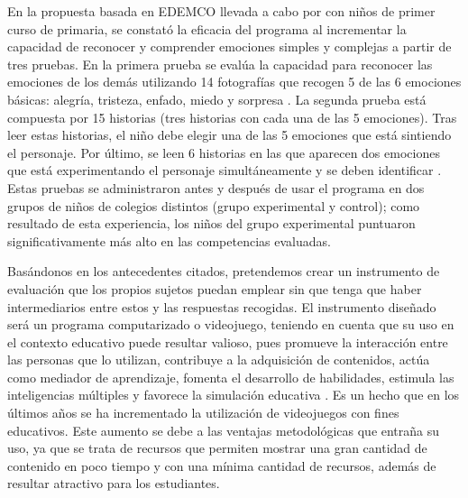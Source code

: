 \documentclass[spanish]{textolivre}
\begin{document}
En la propuesta basada en EDEMCO llevada a cabo por \textcite{ambrona_benito_eficacia_2012} con niños de primer curso de primaria, se constató la eficacia del programa al incrementar la capacidad de reconocer y comprender emociones simples y complejas a partir de tres pruebas. En la primera prueba se evalúa la capacidad para reconocer las emociones de los demás utilizando 14 fotografías que recogen 5 de las 6 emociones básicas: alegría, tristeza, enfado, miedo y sorpresa \cite{ekman_universal_1970,ekman_que_2003,ekman_repertoire_1969,ekman_que_1975}. La segunda prueba está compuesta por 15 historias (tres historias con cada una de las 5 emociones). Tras leer estas historias, el niño debe elegir una de las 5 emociones que está sintiendo el personaje. Por último, se leen 6 historias en las que aparecen dos emociones que está experimentando el personaje simultáneamente y se deben identificar \cite{ambrona_benito_eficacia_2012}. Estas pruebas se administraron antes y después de usar el programa en dos grupos de niños de colegios distintos (grupo experimental y control); como resultado de esta experiencia, los niños del grupo experimental puntuaron significativamente más alto en las competencias evaluadas. 

Basándonos en los antecedentes citados, pretendemos crear un instrumento de evaluación que los propios sujetos puedan emplear sin que tenga que haber intermediarios entre estos y las respuestas recogidas. El instrumento diseñado será un programa computarizado o videojuego, teniendo en cuenta que su uso en el contexto educativo puede resultar valioso, pues promueve la interacción entre las personas que lo utilizan, contribuye a la adquisición de contenidos, actúa como mediador de aprendizaje, fomenta el desarrollo de habilidades, estimula las inteligencias múltiples y favorece la simulación educativa \cite{murcia_dossier:_nodate}. Es un hecho que en los últimos años se ha incrementado la utilización de videojuegos con fines educativos. Este aumento se debe a las ventajas metodológicas que entraña su uso, ya que se trata de recursos que permiten mostrar una gran cantidad de contenido en poco tiempo y con una mínima cantidad de recursos, además de resultar atractivo para los estudiantes. 
\end{document}
